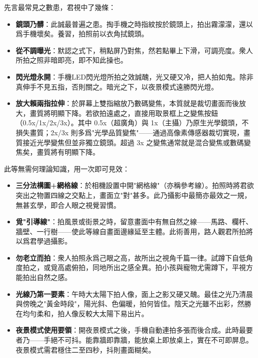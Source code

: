


先言最常見之數患，君視中了幾條：

\begin{itemize}
  \item \textbf{鏡頭乃髒}：此誠最普遍之患。掏手機之時指紋按於鏡頭上，拍出霧濛濛，還以爲手機壞矣。養習，拍照前以衣角拭鏡頭。
  \item \textbf{從不調曝光}：默認之式下，稍點屏乃對焦，然若點畢上下滑，可調亮度。衆人所拍之照非暗即亮，即不知此操也。
  \item \textbf{閃光燈永開}：手機LED閃光燈所拍之效誠醜，光又硬又冷，把人拍如鬼。除非真伸手不見五指，否則關之。暗光之下，以夜景模式遠勝閃光燈。
  \item \textbf{放大賴兩指拉伸}：於屏幕上雙指縮放乃數碼變焦，本質就是裁切畫面而後放大，畫質將明顯下降。若欲拍遠處之，直接用取景框上之變焦按鈕（0.5x/1x/2x/3x）。其中 0.5x（超廣角）與 1x（主攝）乃原生光學鏡頭，不損失畫質；2x/3x 則多爲"光學品質變焦"——通過高像素傳感器裁切實現，畫質接近光學變焦但並非獨立鏡頭。超過 3x 之變焦通常就是混合變焦或數碼變焦矣，畫質將有明顯下降。
\end{itemize}


此等無需何理論知識，用一次即可見效：

\begin{itemize}
  \item \textbf{三分法構圖+網格線}：於相機設置中開"網格線"（亦稱參考線）。拍照時將君欲突出之物置四線之交點上，畫面立"對"甚多。此乃攝影中最簡亦最效之一規，無甚玄學，即合人眼之視覺習慣。
  \item \textbf{覓"引導線"}：拍風景或街景之時，留意畫面中有無自然之線——馬路、欄杆、牆壁、一行樹——使此等線自畫面邊緣延至主體。此術善用，路人觀君所拍將以爲君學過攝影。
  \item \textbf{勿老立而拍}：衆人拍照永爲己眼之高，故所出之視角千篇一律。試蹲下自低角度拍之，或覓高處俯拍，同地所出之感全異。拍小孩與寵物尤需蹲下，平視方能拍出自然之感。
  \item \textbf{光線乃第一要素}：午時大太陽下拍人像，面上之影又硬又醜。最佳之光乃清晨與傍晚之"黃金時段"，陽光斜、色偏暖，拍何皆佳。陰天之光雖不出彩，然勝在均勻柔和，拍人像反較大太陽下易出片。
  \item \textbf{夜景模式使用要領}：開夜景模式之後，手機自動連拍多張而後合成。此時最要者乃——手絕不可抖。能靠牆即靠牆，能放桌上即放桌上，實在不可即屏息。夜景模式需君穩住二至四秒，抖則畫面糊矣。
\end{itemize}

